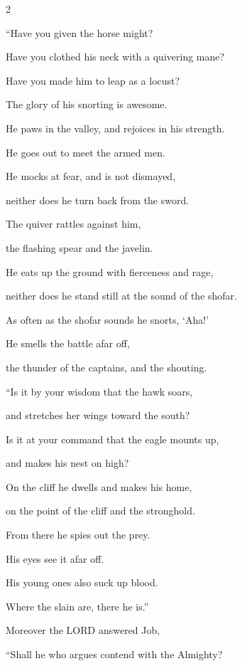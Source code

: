 \begin{multicols}{2}
	\vspace{\baselineskip}
	
	\myverse{}“Have you given the horse might?
	
	Have you clothed his neck with a quivering mane?
	
	\myverse{}Have you made him to leap as a locust?
	
	The glory of his snorting is awesome.
	
	\myverse{}He paws in the valley, and rejoices in his strength.
	
	He goes out to meet the armed men.
	
	\myverse{}He mocks at fear, and is not dismayed,
	
	neither does he turn back from the sword.
	
	\myverse{}The quiver rattles against him,
	
	the flashing spear and the javelin.
	
	\myverse{}He eats up the ground with fierceness and rage,
	
	neither does he stand still at the sound of the shofar.
	
	\myverse{}As often as the shofar sounds he snorts, ‘Aha!’
	
	He smells the battle afar off,
	
	the thunder of the captains, and the shouting.
	
	\vspace{\baselineskip}
	
	
	\myverse{}“Is it by your wisdom that the hawk soars,
	
	and stretches her wings toward the south?
	
	\myverse{}Is it at your command that the eagle mounts up,
	
	and makes his nest on high?
	
	\myverse{}On the cliff he dwells and makes his home,
	
	on the point of the cliff and the stronghold.
	
	\myverse{}From there he spies out the prey.
	
	His eyes see it afar off.
	
	\myverse{}His young ones also suck up blood.
	
	Where the slain are, there he is.”
	
	
	
	\mychapter{} \myverse*{}Moreover the LORD answered Job,
	
	\quad\quad \myverse{}“Shall he who argues contend with the Almighty?
	

\end{multicols}
